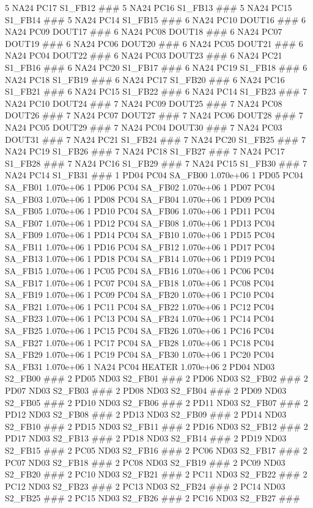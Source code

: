 5 NA24 PC17 S1_FB12 ### 
5 NA24 PC16 S1_FB13 ### 
5 NA24 PC15 S1_FB14 ### 
5 NA24 PC14 S1_FB15 ### 
6 NA24 PC10 DOUT16 ### 
6 NA24 PC09 DOUT17 ### 
6 NA24 PC08 DOUT18 ### 
6 NA24 PC07 DOUT19 ### 
6 NA24 PC06 DOUT20 ### 
6 NA24 PC05 DOUT21 ### 
6 NA24 PC04 DOUT22 ### 
6 NA24 PC03 DOUT23 ### 
6 NA24 PC21 S1_FB16 ### 
6 NA24 PC20 S1_FB17 ### 
6 NA24 PC19 S1_FB18 ### 
6 NA24 PC18 S1_FB19 ### 
6 NA24 PC17 S1_FB20 ### 
6 NA24 PC16 S1_FB21 ### 
6 NA24 PC15 S1_FB22 ### 
6 NA24 PC14 S1_FB23 ### 
7 NA24 PC10 DOUT24 ### 
7 NA24 PC09 DOUT25 ### 
7 NA24 PC08 DOUT26 ### 
7 NA24 PC07 DOUT27 ### 
7 NA24 PC06 DOUT28 ### 
7 NA24 PC05 DOUT29 ### 
7 NA24 PC04 DOUT30 ### 
7 NA24 PC03 DOUT31 ### 
7 NA24 PC21 S1_FB24 ### 
7 NA24 PC20 S1_FB25 ### 
7 NA24 PC19 S1_FB26 ### 
7 NA24 PC18 S1_FB27 ### 
7 NA24 PC17 S1_FB28 ### 
7 NA24 PC16 S1_FB29 ### 
7 NA24 PC15 S1_FB30 ### 
7 NA24 PC14 S1_FB31 ### 
1 PD04 PC04 SA_FB00 1.070e+06 
1 PD05 PC04 SA_FB01 1.070e+06 
1 PD06 PC04 SA_FB02 1.070e+06 
1 PD07 PC04 SA_FB03 1.070e+06 
1 PD08 PC04 SA_FB04 1.070e+06 
1 PD09 PC04 SA_FB05 1.070e+06 
1 PD10 PC04 SA_FB06 1.070e+06 
1 PD11 PC04 SA_FB07 1.070e+06 
1 PD12 PC04 SA_FB08 1.070e+06 
1 PD13 PC04 SA_FB09 1.070e+06 
1 PD14 PC04 SA_FB10 1.070e+06 
1 PD15 PC04 SA_FB11 1.070e+06 
1 PD16 PC04 SA_FB12 1.070e+06 
1 PD17 PC04 SA_FB13 1.070e+06 
1 PD18 PC04 SA_FB14 1.070e+06 
1 PD19 PC04 SA_FB15 1.070e+06 
1 PC05 PC04 SA_FB16 1.070e+06 
1 PC06 PC04 SA_FB17 1.070e+06 
1 PC07 PC04 SA_FB18 1.070e+06 
1 PC08 PC04 SA_FB19 1.070e+06 
1 PC09 PC04 SA_FB20 1.070e+06 
1 PC10 PC04 SA_FB21 1.070e+06 
1 PC11 PC04 SA_FB22 1.070e+06 
1 PC12 PC04 SA_FB23 1.070e+06 
1 PC13 PC04 SA_FB24 1.070e+06 
1 PC14 PC04 SA_FB25 1.070e+06 
1 PC15 PC04 SA_FB26 1.070e+06 
1 PC16 PC04 SA_FB27 1.070e+06 
1 PC17 PC04 SA_FB28 1.070e+06 
1 PC18 PC04 SA_FB29 1.070e+06 
1 PC19 PC04 SA_FB30 1.070e+06 
1 PC20 PC04 SA_FB31 1.070e+06 
1 NA24 PC04 HEATER 1.070e+06 
2 PD04 ND03 S2_FB00 ### 
2 PD05 ND03 S2_FB01 ### 
2 PD06 ND03 S2_FB02 ### 
2 PD07 ND03 S2_FB03 ### 
2 PD08 ND03 S2_FB04 ### 
2 PD09 ND03 S2_FB05 ### 
2 PD10 ND03 S2_FB06 ### 
2 PD11 ND03 S2_FB07 ### 
2 PD12 ND03 S2_FB08 ### 
2 PD13 ND03 S2_FB09 ### 
2 PD14 ND03 S2_FB10 ### 
2 PD15 ND03 S2_FB11 ### 
2 PD16 ND03 S2_FB12 ### 
2 PD17 ND03 S2_FB13 ### 
2 PD18 ND03 S2_FB14 ### 
2 PD19 ND03 S2_FB15 ### 
2 PC05 ND03 S2_FB16 ### 
2 PC06 ND03 S2_FB17 ### 
2 PC07 ND03 S2_FB18 ### 
2 PC08 ND03 S2_FB19 ### 
2 PC09 ND03 S2_FB20 ### 
2 PC10 ND03 S2_FB21 ### 
2 PC11 ND03 S2_FB22 ### 
2 PC12 ND03 S2_FB23 ### 
2 PC13 ND03 S2_FB24 ### 
2 PC14 ND03 S2_FB25 ### 
2 PC15 ND03 S2_FB26 ### 
2 PC16 ND03 S2_FB27 ### 
